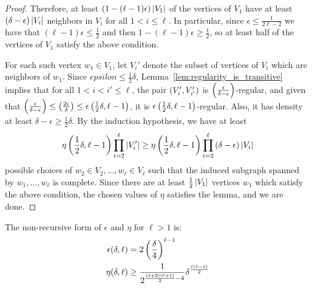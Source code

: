 \begin{lemma}
\begin{proof}
            Therefore, at least $(1 - (\ell -1) \epsilon) \left| V_1 \right|$ of the vertices of $V_1$ have at least
            $(\delta - \epsilon) \left| V_i \right|$ neighbors in $V_i$ for all $1 < i \leq \ell$.
            In particular, since $\epsilon \leq \frac{1}{2\ell - 2}$ we have that $(\ell - 1) \epsilon \leq \frac{1}{2}$
            and then $1 - (\ell - 1) \epsilon \geq \frac{1}{2}$, so at least half of the vertices of $V_1$ satisfy the
            above condition.

            For each such vertex $w_1 \in V_1$, let $V_i'$ denote the subset of vertices of $V_i$ which are neighbors
            of $w_1$.
            Since $epsilon \leq \frac{1}{2}\delta$, Lemma~\ref{lem:regularity_is_transitive} implies that for all
            $1 < i < i' \leq \ell$, the pair $\left( V_i', V_{i'}' \right)$ is $\left( \frac{\epsilon}{\delta-\epsilon} \right)$-regular,
            and given that $\left( \frac{\epsilon}{\delta-\epsilon} \right) \leq \left( \frac{2\epsilon}{\delta} \right) \leq \epsilon\left( \frac{1}{2}\delta, \ell-1 \right)$,
            it is $\epsilon\left( \frac{1}{2}\delta, \ell-1 \right)$-regular.
            Also, it has density at least $\delta - \epsilon \geq \frac{1}{2} \delta$.
            By the induction hypothesis, we have at least
            \[
                \eta \left( \frac{1}{2}\delta, \ell-1 \right) \prod_{i=2}^\ell \left| V_i' \right|
                    \geq \eta \left( \frac{1}{2}\delta, \ell-1 \right) \prod_{i=2}^\ell \left( \delta - \epsilon \right) \left| V_i \right|
            \]
            possible choices of $w_2 \in V_2, \dots, w_\ell \in V_\ell$ such that the induced subgraph spanned by
            $w_1, \dots, w_\ell$ is complete.
            Since there are at least $\frac{1}{2} \left| V_1 \right|$ vertices $w_1$ which satisfy the above condition,
            the chosen values of $\eta$ satisfies the lemma, and we are done.
        \end{proof}
    \end{lemma}

    \begin{remark}
        The non-recursive form of $\epsilon$ and $\eta$ for $\ell > 1$ is:
        \begin{align*}
            \epsilon(\delta, \ell) & = 2 \left( \frac{\delta}{4} \right)^{\ell-1} \\
            \eta(\delta, \ell) & \geq \frac{1}{2^{\frac{(\ell+2)(\ell+1)}{2}-4}} \delta^{\frac{\ell(\ell-1)}{2}}
        \end{align*}
    \end{remark}

